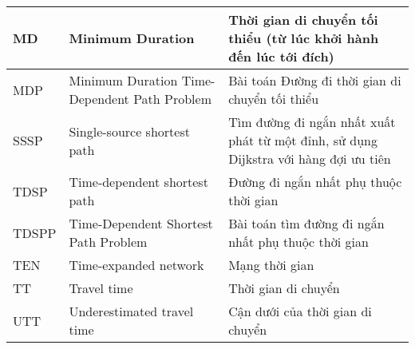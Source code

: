 \documentclass[fontsize=14pt,DIV=15pt,twoside=false]{scrbook}
\renewcommand{\baselinestretch}{1.3}
\newcommand{\toc}[0]{
\renewcommand{\baselinestretch}{1.0}
\tableofcontents
\listoffigures
\listoftables
}
\begin{document}
\begin{table}[h]
\begin{tabularx}{\textwidth}{|p{1.5cm}|X|X|}
    MD               & Minimum Duration                                  & Thời gian di chuyển tối thiểu (từ lúc khởi hành đến lúc tới đích)                   \\ \midrule
    MDP              & Minimum Duration Time-Dependent Path Problem      & Bài toán Đường đi thời gian di chuyển tối thiểu                                     \\ \midrule
    SSSP             & Single-source shortest path                       & Tìm đường đi ngắn nhất xuất phát từ một đỉnh, sử dụng Dijkstra với hàng đợi ưu tiên \\ \midrule
    TDSP             & Time-dependent shortest path                      & Đường đi ngắn nhất phụ thuộc thời gian                                              \\ \midrule
    TDSPP            & Time-Dependent Shortest Path Problem              & Bài toán tìm đường đi ngắn nhất phụ thuộc thời gian                                 \\ \midrule
    TEN              & Time-expanded network                             & Mạng thời gian                                                                      \\ \midrule
    TT               & Travel time                                       & Thời gian di chuyển                                                                 \\ \midrule
    UTT              & Underestimated travel time                        & Cận dưới của thời gian di chuyển                                                    \\ \bottomrule
    \end{tabularx}
\end{table}


\toc

%
%
%




\printbibliography
%

\backmatter
\end{document}
